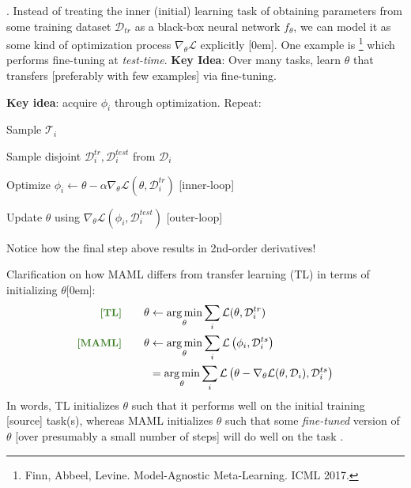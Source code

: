 \documentclass[11pt]{article}
\newcommand\task{\mathscr{T}}
\begin{document}
. Instead of treating the inner (initial) learning task of obtaining parameters from some training dataset $\mathcal{D}_{tr}$ as a black-box neural network $f_{\theta}$, we can model it as some kind of optimization process $\nabla_{\theta} \mathcal L$ explicitly [0em]. One example is \footnote{Finn, Abbeel, Levine. Model-Agnostic Meta-Learning. ICML 2017.} which performs fine-tuning at \textit{test-time}.
\textbf{Key Idea}: Over many tasks, learn $\theta$ that transfers [preferably with few examples] via fine-tuning.

\begin{compactitem}
	
\end{compactitem}

\begin{algorithm}
	\textbf{Key idea}: acquire $\phi_i$ through optimization. Repeat:
	\begin{compactenum}
		\item Sample $\task_i$
		\item Sample disjoint $\mathcal{D}_i^{tr}, \mathcal{D}_i^{test}$ from $\mathcal{D}_i$
		\item Optimize $\phi_i \leftarrow \theta - \alpha \nabla_{\theta} \mathcal L (\theta, \mathcal{D}_i^{tr})$ \scriptsize{[inner-loop]}
		\item Update $\theta$ using $\nabla_{\theta} \mathcal L (\phi_i, \mathcal{D}_i^{test})$  \scriptsize{[outer-loop]}
	\end{compactenum}
	Notice how the final step above results in 2nd-order derivatives!
\end{algorithm}

Clarification on how MAML differs from transfer learning (TL) in terms of initializing $\theta$[0em]:
\begin{align}
	\mtgreen{[TL]} \qquad \theta 
		&\leftarrow \argmin_{\theta} \sum_i \mathcal L (\theta, \mathcal{D}_i^{tr}) \\
	\mtgreen{[MAML]} \qquad \theta
		&\leftarrow \argmin_{\theta} \sum_i \mathcal L \lr{
			\phi_i,
			\mathcal{D}_i^{ts}
		} \\
		&=\argmin_{\theta} \sum_i \mathcal L \lr{
			\theta - \nabla_{\theta} \mathcal L  (\theta, \mathcal{D}_i),
			\mathcal{D}_i^{ts}  }
\end{align}
In words, TL initializes $\theta$ such that it performs well on the initial training [source] task(s), whereas MAML initializes $\theta$ such that some \textit{fine-tuned} version of $\theta$ [over presumably a small number of steps] will do well on the task . 
\end{document}
